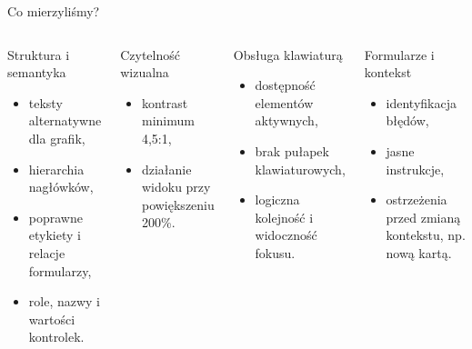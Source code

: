 \documentclass[aspectratio=169,11pt]{beamer}
\begin{document}
\begin{frame}{Co mierzyliśmy?}
  \begin{columns}[T,totalwidth=\textwidth]
      \begin{block}{Struktura i semantyka}
        \begin{itemize}
          \item teksty alternatywne dla grafik,
          \item hierarchia nagłówków,
          \item poprawne etykiety i relacje formularzy,
          \item role, nazwy i wartości kontrolek.
        \end{itemize}
      \end{block}

      \begin{block}{Czytelność wizualna}
        \begin{itemize}
          \item kontrast minimum 4,5:1,
          \item działanie widoku przy powiększeniu 200\%.
        \end{itemize}
      \end{block}

      \begin{block}{Obsługa klawiaturą}
        \begin{itemize}
          \item dostępność elementów aktywnych,
          \item brak pułapek klawiaturowych,
          \item logiczna kolejność i widoczność fokusu.
        \end{itemize}
      \end{block}

      \begin{block}{Formularze i kontekst}
        \begin{itemize}
          \item identyfikacja błędów,
          \item jasne instrukcje,
          \item ostrzeżenia przed zmianą kontekstu, np. nową kartą.
        \end{itemize}
      \end{block}
  \end{columns}
\end{frame}
\end{document}
